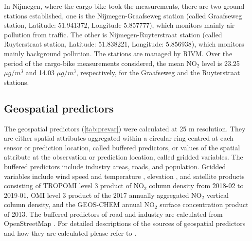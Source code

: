 \documentclass{article}
\begin{document}
In Nijmegen, where the cargo-bike took the measurements, there are two ground stations established, one is the Nijmegen-Graafseweg station (called Graafseweg station, Latitude: 51.941372, Longitude 5.857777), which monitors mainly air pollution from traffic. The other is Nijmegen-Ruyterstraat station (called Ruyterstraat station, Latitude: 51.838221, Longitude: 5.856938), which monitors mainly background pollution. The stations are managed by RIVM. Over the period of the cargo-bike measurements considered, the mean NO$_2$ level is 23.25 $\mu g/m^3$ and 14.03 $\mu g/m^3$, respectively, for the Graafseweg and the Ruyterstraat stations.  

\subsection{Geospatial predictors}
 The geospatial predictors (\cref{tab:prevar}) were calculated at 25 m resolution. They are either spatial attributes aggregated within a circular ring centred at each sensor or prediction location, called buffered predictors, or values of the spatial attribute at the observation or prediction location, called gridded variables. The buffered predictors include industry areas, roads, and population. Gridded variables include wind speed and temperature \citep{dee2011era}, elevation \citep{amante2009etopo1}, and satellite products consisting of TROPOMI level 3 product of NO$_2$ column density from 2018-02 to 2019-01, OMI level 3 product of the 2017 annually aggregated NO$_2$ vertical column density, and the GEOS-CHEM \citep{bey2001global,GEOS-CHEM} annual NO$_2$ surface concentration product \citep{geddes2016long} of 2013. The buffered predictors of road and industry are calculated from OpenStreetMap  \citep{openstreetmap}. For detailed descriptions of the sources of geospatial predictors and how they are calculated please refer to \cite{luglobal}.   
  
\end{document}
